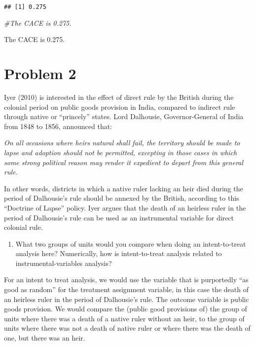\documentclass[
]{article}
\newenvironment{Shaded}{\begin{snugshade}}{\end{snugshade}}
\newcommand{\CommentTok}[1]{\textcolor[rgb]{0.56,0.35,0.01}{\textit{#1}}}
\providecommand{\tightlist}{%
  \setlength{\itemsep}{0pt}\setlength{\parskip}{0pt}}
\begin{document}
\begin{verbatim}
## [1] 0.275
\end{verbatim}

\begin{Shaded}
\begin{Highlighting}[]
\CommentTok{\#The CACE is 0.275.}
\end{Highlighting}
\end{Shaded}

The CACE is 0.275.

\hypertarget{problem-2}{%
\section{Problem 2}\label{problem-2}}

Iyer (2010) is interested in the effect of direct rule by the British
during the colonial period on public goods provision in India, compared
to indirect rule through native or ``princely'' states. Lord Dalhousie,
Governor-General of India from 1848 to 1856, announced that:

\textit{On all occasions where heirs natural shall fail, the territory should be made to lapse and adoption should not be permitted, excepting in those cases in which some strong political reason may render it expedient to depart from this general rule.}

In other words, districts in which a native ruler lacking an heir died
during the period of Dalhousie's rule should be annexed by the British,
according to this ``Doctrine of Lapse'' policy. Iyer argues that the
death of an heirless ruler in the period of Dalhousie's rule can be used
as an instrumental variable for direct colonial rule.

\begin{enumerate}
\def\labelenumi{(\alph{enumi})}
\tightlist
\item
  What two groups of units would you compare when doing an
  intent-to-treat analysis here? Numerically, how is intent-to-treat
  analysis related to instrumental-variables analysis?
\end{enumerate}

For an intent to treat analysis, we would use the variable that is
purportedly ``as good as random'' for the treatment assignment variable,
in this case the death of an heirless ruler in the period of Dalhousie's
rule. The outcome variable is public goods provision. We would compare
the (public good provisions of) the group of units where there was a
death of a native ruler without an heir, to the group of units where
there was not a death of native ruler or where there was the death of
one, but there was an heir.
\end{document}
